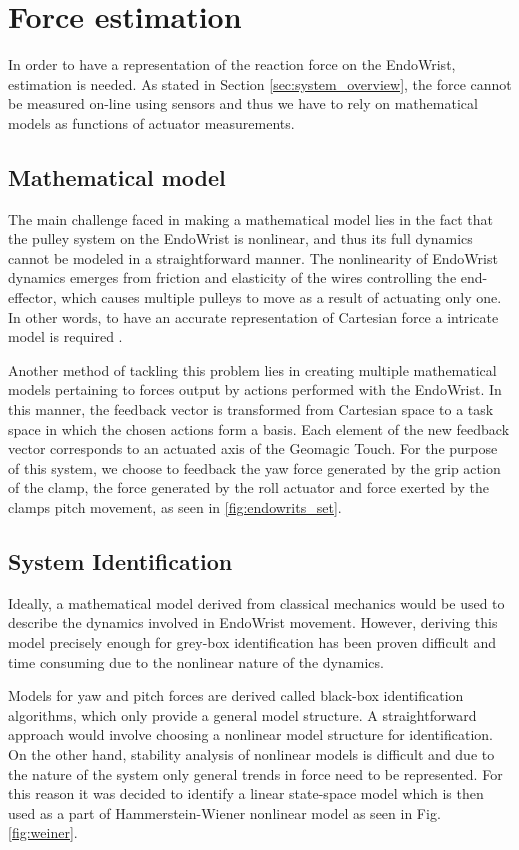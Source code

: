 \section{Force estimation}\label{sec:force_estimation}
In order to have a representation of the reaction force on the EndoWrist, estimation is needed.
As stated in Section \ref{sec:system_overview}, the force cannot be measured on-line using sensors and thus we have to rely on mathematical models as functions of actuator measurements.


\subsection{Mathematical model}
The main challenge faced in making a mathematical model lies in the fact that the pulley system on the EndoWrist is nonlinear, and thus its full dynamics cannot be modeled in a straightforward manner. 
The nonlinearity of EndoWrist dynamics emerges from friction and elasticity of the wires controlling the end-effector, which causes multiple pulleys to move as a result of actuating only one. 
In other words, to have an accurate representation of Cartesian force a intricate model is required  \cite{kim2014dynamic}.

Another method of tackling this problem lies in creating multiple mathematical models pertaining to forces output by actions performed with the EndoWrist.
In this manner, the feedback vector is transformed from Cartesian space to a task space in which the chosen actions form a basis.
Each element of the new feedback vector corresponds to an actuated axis of the Geomagic Touch.
For the purpose of this system, we choose to feedback the yaw force generated by the grip action of the clamp, the force generated by the roll actuator and force exerted by the clamps pitch movement, as seen in \ref{fig:endowrits_set}.

\subsection{System Identification}
Ideally, a mathematical model derived from classical mechanics would be used to describe the dynamics involved in EndoWrist movement.
However, deriving this model precisely enough for grey-box identification has been proven difficult and time consuming due to the nonlinear nature of the dynamics.

Models for yaw and pitch forces are derived called black-box identification algorithms, which only provide a general model structure. 
A straightforward approach would involve choosing a nonlinear model structure for identification.
On the other hand, stability analysis of nonlinear models is difficult and due to the nature of the system only general trends in force need to be represented.
For this reason it was decided to identify a linear state-space model which is then used as a part of Hammerstein-Wiener  \cite{zhu2002estimation} nonlinear model as seen in Fig. \ref{fig:weiner}.


